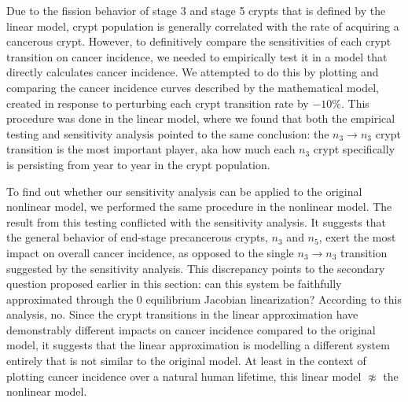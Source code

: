 Due to the fission behavior of stage 3 and stage 5 crypts that is defined by the linear model, crypt population is generally correlated with the rate of acquiring a cancerous crypt. However, to definitively compare the sensitivities of each crypt transition on cancer incidence, we needed to empirically test it in a model that directly calculates cancer incidence. We attempted to do this by plotting and comparing the cancer incidence curves described by the mathematical model, created in response to perturbing each crypt transition rate by $-10\%$. This procedure was done in the linear model, where we found that both the empirical testing and sensitivity analysis pointed to the same conclusion: the $n_3 \rightarrow n_3$ crypt transition is the most important player, aka how much each $n_3$ crypt specifically is persisting from year to year in the crypt population. 

To find out whether our sensitivity analysis can be applied to the original nonlinear model, we performed the same procedure in the nonlinear model. The result from this testing conflicted with the sensitivity analysis. It suggests that the general behavior of end-stage precancerous crypts, $n_3$ and $n_5$, exert the most impact on overall cancer incidence, as opposed to the single $n_3 \rightarrow n_3$ transition suggested by the sensitivity analysis. This discrepancy points to the secondary question proposed earlier in this section: can this system be faithfully approximated through the 0 equilibrium Jacobian linearization? According to this analysis, no. Since the crypt transitions in the linear approximation have demonstrably different impacts on cancer incidence compared to the original model, it suggests that the linear approximation is modelling a different system entirely that is not similar to the original model. At least in the context of plotting cancer incidence over a natural human lifetime, this linear model $\not\approx$ the nonlinear model.


